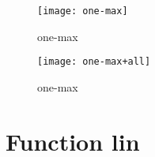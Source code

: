 \begin{center}
\begin{figure}[h]
\centering
\texttt{[image: one-max]}
\caption{one-max}
\end{figure}
\end{center}

\begin{center}
\begin{figure}[h]
\centering
\texttt{[image: one-max+all]}
\caption{one-max}
\end{figure}
\end{center}

\newpage

\section{Function lin}
